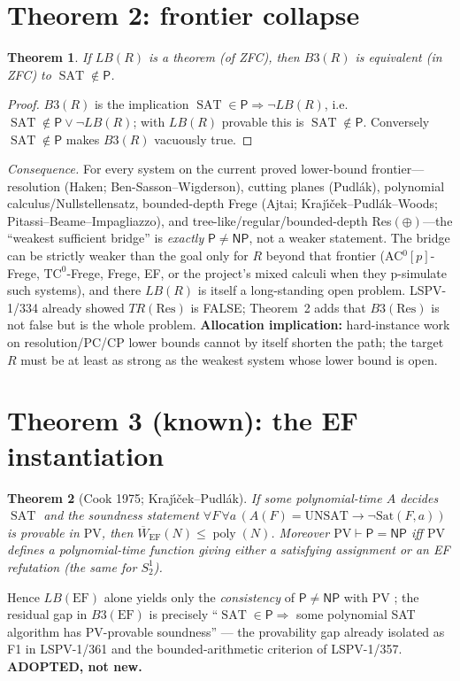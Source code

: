 \documentclass[11pt]{article}
\newtheorem{theorem}{Theorem}
\newcommand{\SAT}{\operatorname{SAT}}
\newcommand{\poly}{\operatorname{poly}}
\newcommand{\Wb}{\overline W}
\begin{document}
\section{Theorem 2: frontier collapse}
\begin{theorem}
If $LB(R)$ is a theorem (of ZFC), then $B3(R)$ is equivalent (in ZFC) to
$\SAT\notin\mathsf P$.
\end{theorem}
\begin{proof}
$B3(R)$ is the implication $\SAT\in\mathsf P\Rightarrow\neg LB(R)$,
i.e.\ $\SAT\notin\mathsf P\vee\neg LB(R)$; with $LB(R)$ provable this is
$\SAT\notin\mathsf P$. Conversely $\SAT\notin\mathsf P$ makes $B3(R)$
vacuously true.
\end{proof}
\noindent\emph{Consequence.} For every system on the current proved
lower-bound frontier---resolution (Haken; Ben-Sasson--Wigderson),
cutting planes (Pudl\'ak), polynomial calculus/Nullstellensatz,
bounded-depth Frege (Ajtai; Kraj\'{\i}\v{c}ek--Pudl\'ak--Woods;
Pitassi--Beame--Impagliazzo), and tree-like/regular/bounded-depth
Res$(\oplus)$---the ``weakest sufficient bridge'' is \emph{exactly}
$\mathsf P\ne\mathsf{NP}$, not a weaker statement. The bridge can be
strictly weaker than the goal only for $R$ beyond that frontier
(AC$^0[p]$-Frege, $\mathrm{TC}^0$-Frege, Frege, EF, or the project's mixed
calculi when they p-simulate such systems), and there $LB(R)$ is itself a
long-standing open problem. LSPV-1/334 already showed $TR(\mathrm{Res})$
is FALSE; Theorem~2 adds that $B3(\mathrm{Res})$ is not false but is the
whole problem. \textbf{Allocation implication:} hard-instance work on
resolution/PC/CP lower bounds cannot by itself shorten the path; the
target $R$ must be at least as strong as the weakest system whose lower
bound is open.

\section{Theorem 3 (known): the EF instantiation}
\begin{theorem}[Cook 1975; Kraj\'{\i}\v{c}ek--Pudl\'ak]
If some polynomial-time $A$ decides $\SAT$ and the soundness statement
$\forall F\,\forall a\,(A(F)=\mathrm{UNSAT}\rightarrow \neg\mathrm{Sat}(F,a))$
is provable in $\mathrm{PV}$, then $\Wb_{\mathrm{EF}}(N)\le\poly(N)$.
Moreover $\mathrm{PV}\vdash\mathsf P=\mathsf{NP}$ iff $\mathrm{PV}$ defines a
polynomial-time function giving either a satisfying assignment or an EF
refutation (the same for $S^1_2$).
\end{theorem}
Hence $LB(\mathrm{EF})$ alone yields only the \emph{consistency} of
$\mathsf P\ne\mathsf{NP}$ with PV \cite{krajicek-survey}; the residual gap
in $B3(\mathrm{EF})$ is precisely ``$\SAT\in\mathsf P\Rightarrow$ some
polynomial SAT algorithm has PV-provable soundness'' --- the
provability gap already isolated as F1 in LSPV-1/361 and the bounded-arithmetic
criterion of LSPV-1/357. \textbf{ADOPTED, not new.}
\end{document}
